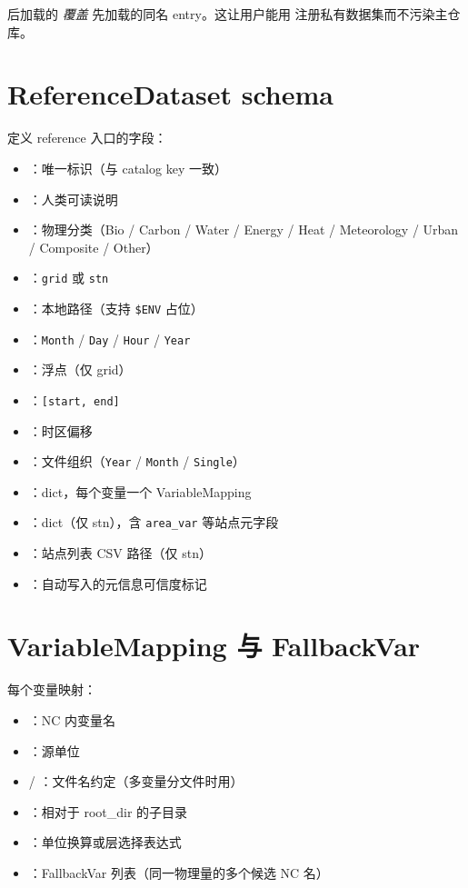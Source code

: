 后加载的 \emph{覆盖} 先加载的同名 entry。这让用户能用  注册私有数据集而不污染主仓库。

\section{ReferenceDataset schema}

 定义 reference 入口的字段：

\begin{itemize}
  \item {}：唯一标识（与 catalog key 一致）
  \item {}：人类可读说明
  \item {}：物理分类（Bio / Carbon / Water / Energy / Heat / Meteorology / Urban / Composite / Other）
  \item {}：\texttt{grid} 或 \texttt{stn}
  \item {}：本地路径（支持 \texttt{\$ENV} 占位）
  \item {}：\texttt{Month} / \texttt{Day} / \texttt{Hour} / \texttt{Year}
  \item {}：浮点（仅 grid）
  \item {}：\texttt{[start, end]}
  \item {}：时区偏移
  \item {}：文件组织（\texttt{Year} / \texttt{Month} / \texttt{Single}）
  \item {}：dict，每个变量一个 VariableMapping
  \item {}：dict（仅 stn），含 \texttt{area\_var} 等站点元字段
  \item {}：站点列表 CSV 路径（仅 stn）
  \item {}：自动写入的元信息可信度标记
\end{itemize}

\section{VariableMapping 与 FallbackVar}

每个变量映射：

\begin{itemize}
  \item {}：NC 内变量名
  \item {}：源单位
  \item {} / ：文件名约定（多变量分文件时用）
  \item {}：相对于 root\_dir 的子目录
  \item {}：单位换算或层选择表达式
  \item {}：FallbackVar 列表（同一物理量的多个候选 NC 名）
\end{itemize}


